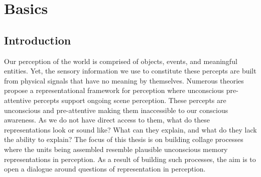 \chapter{Basics}
\label{chap:basics}
\minitoc

\section{Introduction}






Our perception of the world is comprised of objects, events, and meaningful entities.  Yet, the sensory information we use to constitute these percepts are built from physical signals that have no meaning by themselves.  Numerous theories propose a representational framework for perception where unconscious pre-attentive percepts support ongoing scene perception.  These percepts are unconscious and pre-attentive making them inaccessible to our conscious awareness.  As we do not have direct access to them, what do these representations look or sound like?  What can they explain, and what do they lack the ability to explain? The focus of this thesis is on building collage processes where the units being assembled resemble plausible unconscious memory representations in perception.  As a result of building such processes, the aim is to open a dialogue around questions of representation in perception.  

